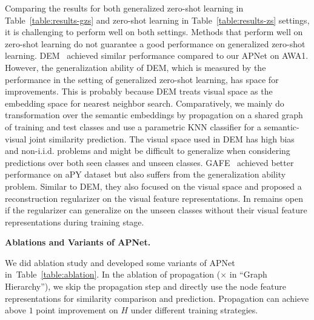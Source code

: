 \documentclass[letterpaper]{article}
\def\Tabref#1{Table~\ref{#1}}
\begin{document}
Comparing the results for both generalized zero-shot learning in Table~\ref{table:results-gzs} and zero-shot learning in Table~\ref{table:results-zs} settings, it is challenging to perform well on both settings. Methods that perform well on zero-shot learning do not guarantee a good performance on generalized zero-shot learning.
DEM~\cite{zhang2017learning} achieved similar performance compared to our APNet on AWA1. However, the generalization ability of DEM, which is measured by the performance in the setting of generalized zero-shot learning, has space for improvements. This is probably because DEM treats visual space as the embedding space for nearest neighbor search. Comparatively, we mainly do transformation over the semantic embeddings by propagation on a shared graph of training and test classes and use a parametric KNN classifier for a semantic-visual joint similarity prediction.
The visual space used in DEM has high bias and non-i.i.d. problems and might be difficult to generalize when considering predictions over both seen classes and unseen classes.
GAFE~\cite{wang2017mgae} achieved better performance on aPY dataset but also suffers from the generalization ability problem. Similar to DEM, they also focused on the visual space and proposed a reconstruction regularizer on the visual feature representations. In remains open if the regularizer can generalize on the unseen classes without their visual feature representations during training stage.







\noindent\textbf{Ablations and Variants of APNet.}

\noindent We did ablation study and developed some variants of APNet in~\Tabref{table:ablation}.
In the ablation of propagation ($\times$ in ``Graph Hierarchy''), we skip the propagation step and directly use the node feature representations for similarity comparison and prediction.
Propagation can achieve above $1$ point improvement on $H$ under different training strategies.
\end{document}
